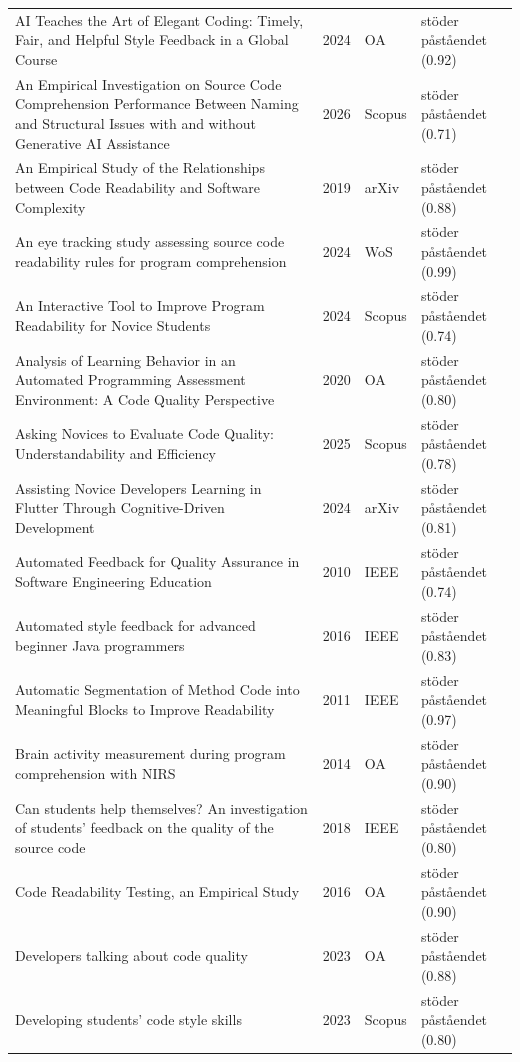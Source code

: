 \begin{longtable}{@{}%
  >{\raggedright\arraybackslash}p{}c%
  >{\raggedright\arraybackslash}p{}%
  >{\raggedright\arraybackslash}p{}@{}}
AI Teaches the Art of Elegant Coding: Timely, Fair, and Helpful Style Feedback in a Global Course & 2024 & OA & stöder påståendet (0.92) \\
An Empirical Investigation on Source Code Comprehension Performance Between Naming and Structural Issues with and without Generative AI Assistance & 2026 & Scopus & stöder påståendet (0.71) \\
An Empirical Study of the Relationships between Code Readability and Software Complexity & 2019 & arXiv & stöder påståendet (0.88) \\
An eye tracking study assessing source code readability rules for program comprehension & 2024 & WoS & stöder påståendet (0.99) \\
An Interactive Tool to Improve Program Readability for Novice Students & 2024 & Scopus & stöder påståendet (0.74) \\
Analysis of Learning Behavior in an Automated Programming Assessment Environment: A Code Quality Perspective & 2020 & OA & stöder påståendet (0.80) \\
Asking Novices to Evaluate Code Quality: Understandability and Efficiency & 2025 & Scopus & stöder påståendet (0.78) \\
Assisting Novice Developers Learning in Flutter Through Cognitive-Driven Development & 2024 & arXiv & stöder påståendet (0.81) \\
Automated Feedback for Quality Assurance in Software Engineering Education & 2010 & IEEE & stöder påståendet (0.74) \\
Automated style feedback for advanced beginner Java programmers & 2016 & IEEE & stöder påståendet (0.83) \\
Automatic Segmentation of Method Code into Meaningful Blocks to Improve Readability & 2011 & IEEE & stöder påståendet (0.97) \\
Brain activity measurement during program comprehension with NIRS & 2014 & OA & stöder påståendet (0.90) \\
Can students help themselves? An investigation of students' feedback on the quality of the source code & 2018 & IEEE & stöder påståendet (0.80) \\
Code Readability Testing, an Empirical Study & 2016 & OA & stöder påståendet (0.90) \\
Developers talking about code quality & 2023 & OA & stöder påståendet (0.88) \\
Developing students' code style skills & 2023 & Scopus & stöder påståendet (0.80) \\

\end{longtable}
